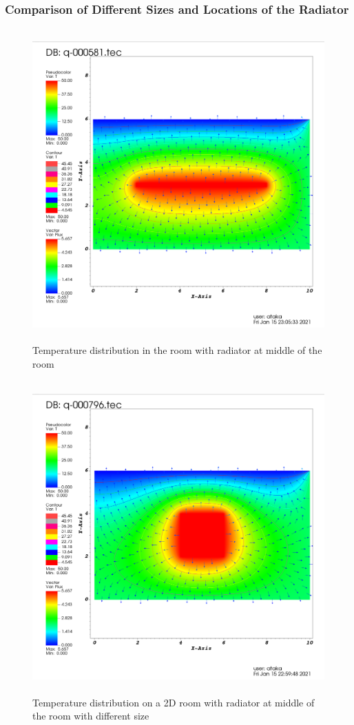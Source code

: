 \documentclass[letterpaper,12pt]{article}
\begin{document}
\subsubsection{Comparison of Different Sizes and Locations of the Radiator}
\begin{figure}[H] 
	\centering 
	\includegraphics[max height=12cm]{graphs/radiator_middle_long/radiator_middle_long.png}
	\caption{Temperature distribution in the room with radiator at middle of the room}
 	\label{fig:middle}
\end{figure}
\begin{figure}[H] 
	\centering 
	\includegraphics[max height=12cm]{graphs/radiator_middle/radiator_middle.png}
	\caption{Temperature distribution on a 2D room with radiator at middle of the room with different size}
 	\label{fig:middlelong}
\end{figure}
\end{document}
